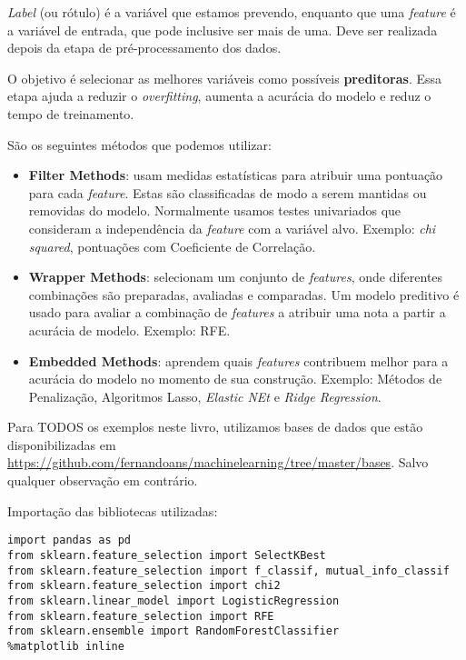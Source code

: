\textit{Label} (ou rótulo) é a variável que estamos prevendo, enquanto que uma \textit{feature} é a variável de entrada, que pode inclusive ser mais de uma. Deve ser realizada depois da etapa de pré-processamento dos dados. 

O objetivo é selecionar as melhores variáveis como possíveis \textbf{preditoras}. Essa etapa ajuda a reduzir o \textit{overfitting}, aumenta a acurácia do modelo e reduz o tempo de treinamento.

São os seguintes métodos que podemos utilizar: \vspace{-1em}
\begin{itemize}
	\item \textbf{Filter Methods}: usam medidas estatísticas para atribuir uma pontuação para cada \textit{feature}. Estas são classificadas de modo a serem mantidas ou removidas do modelo. Normalmente usamos testes univariados que consideram a independência da \textit{feature} com a variável alvo. Exemplo: \textit{chi squared}, pontuações com Coeficiente de Correlação.
	\item \textbf{Wrapper Methods}: selecionam um conjunto de \textit{features}, onde diferentes combinações são preparadas, avaliadas e comparadas. Um modelo preditivo é usado para avaliar a combinação de \textit{features} a atribuir uma nota a partir a acurácia de modelo. Exemplo: RFE.
	\item \textbf{Embedded Methods}: aprendem quais \textit{features} contribuem melhor para a acurácia do modelo no momento de sua construção. Exemplo: Métodos de Penalização, Algoritmos Lasso, \textit{Elastic NEt} e \textit{Ridge Regression}.
\end{itemize}

\begin{note} 
	Para TODOS os exemplos neste livro, utilizamos bases de dados que estão disponibilizadas em \url{https://github.com/fernandoans/machinelearning/tree/master/bases}. Salvo qualquer observação em contrário.
\end{note}

Importação das bibliotecas utilizadas:
\begin{lstlisting}
import pandas as pd
from sklearn.feature_selection import SelectKBest
from sklearn.feature_selection import f_classif, mutual_info_classif
from sklearn.feature_selection import chi2
from sklearn.linear_model import LogisticRegression
from sklearn.feature_selection import RFE
from sklearn.ensemble import RandomForestClassifier
%matplotlib inline
\end{lstlisting}

